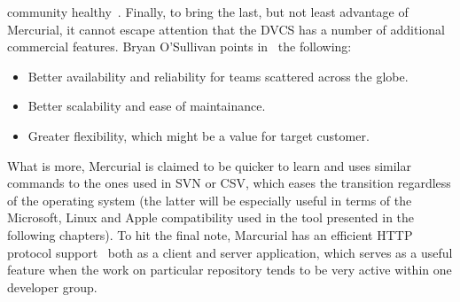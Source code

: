 community healthy~\cite{git_talk,svn_talk}. Finally, to bring the last, but not least advantage of Mercurial, it cannot escape attention that the DVCS has a number of additional commercial features. Bryan O'Sullivan points in~\cite[page 6]{hg_book} the following: 
\begin{itemize}
\item{Better availability and reliability for teams scattered across the globe.}
\item{Better scalability and ease of maintainance.}
\item{Greater flexibility, which might be a value for target customer.}
\end{itemize}
What is more, Mercurial is claimed to be quicker to learn and uses similar commands to the ones used in SVN or CSV, which eases the transition regardless of the operating system (the latter will be especially useful in terms of the Microsoft, Linux and Apple compatibility used in the tool presented in the following chapters). To hit the final note, Marcurial has an efficient HTTP protocol support~\cite{google_hg_git_compare} both as a client and server application, which serves as a useful feature when the work on particular repository tends to be very active within one developer group.

